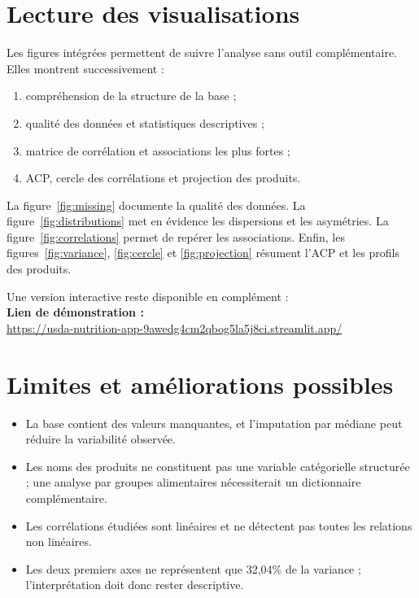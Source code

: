 \documentclass[12pt,a4paper]{article}
\begin{document}
\section{Lecture des visualisations}

Les figures intégrées permettent de suivre l'analyse sans outil complémentaire. Elles montrent successivement :
\begin{enumerate}
    \item compréhension de la structure de la base ;
    \item qualité des données et statistiques descriptives ;
    \item matrice de corrélation et associations les plus fortes ;
    \item ACP, cercle des corrélations et projection des produits.
\end{enumerate}

La figure~\ref{fig:missing} documente la qualité des données. La figure~\ref{fig:distributions} met en évidence les dispersions et les asymétries. La figure~\ref{fig:correlations} permet de repérer les associations. Enfin, les figures~\ref{fig:variance}, \ref{fig:cercle} et \ref{fig:projection} résument l'ACP et les profils des produits.

\medskip
Une version interactive reste disponible en complément :\\
\noindent\textbf{Lien de démonstration :}\\
\url{https://usda-nutrition-app-9awedg4cm2qbog5la5j8ci.streamlit.app/}

\section{Limites et améliorations possibles}

\begin{itemize}
    \item La base contient des valeurs manquantes, et l'imputation par médiane peut réduire la variabilité observée.
    \item Les noms des produits ne constituent pas une variable catégorielle structurée ; une analyse par groupes alimentaires nécessiterait un dictionnaire complémentaire.
    \item Les corrélations étudiées sont linéaires et ne détectent pas toutes les relations non linéaires.
    \item Les deux premiers axes ne représentent que 32,04\% de la variance ; l'interprétation doit donc rester descriptive.
\end{itemize}
\end{document}
